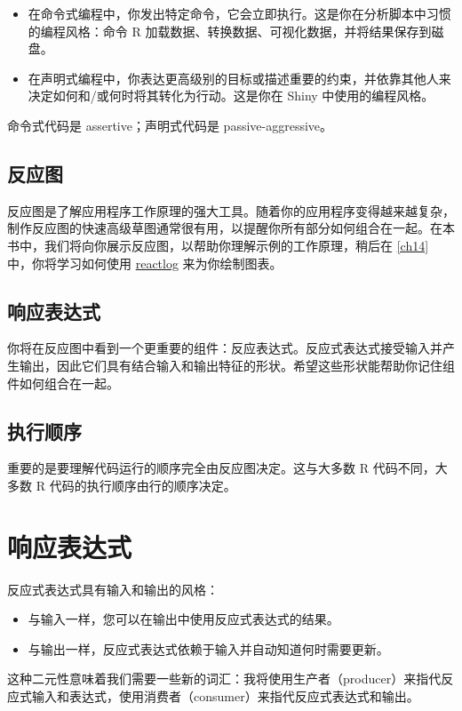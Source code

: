 \begin{itemize}
    \item 在命令式编程中，你发出特定命令，它会立即执行。这是你在分析脚本中习惯的编程风格：命令 R 加载数据、转换数据、可视化数据，并将结果保存到磁盘。
    \item 在声明式编程中，你表达更高级别的目标或描述重要的约束，并依靠其他人来决定如何和/或何时将其转化为行动。这是你在 Shiny 中使用的编程风格。
\end{itemize}
命令式代码是 assertive；声明式代码是 passive-aggressive。
\subsection{反应图}
反应图是了解应用程序工作原理的强大工具。随着你的应用程序变得越来越复杂，制作反应图的快速高级草图通常很有用，以提醒你所有部分如何组合在一起。在本书中，我们将向你展示反应图，以帮助你理解示例的工作原理，稍后在 \autoref{ch14} 中，你将学习如何使用 \href{https://cran.r-project.org/web/packages/reactlog/index.html}{reactlog} 来为你绘制图表。
\subsection{响应表达式}
你将在反应图中看到一个更重要的组件：反应表达式。反应式表达式接受输入并产生输出，因此它们具有结合输入和输出特征的形状。希望这些形状能帮助你记住组件如何组合在一起。
\subsection{执行顺序}
重要的是要理解代码运行的顺序完全由反应图决定。这与大多数 R 代码不同，大多数 R 代码的执行顺序由行的顺序决定。
\section{响应表达式}
反应式表达式具有输入和输出的风格：
\begin{itemize}
    \item 与输入一样，您可以在输出中使用反应式表达式的结果。
    \item 与输出一样，反应式表达式依赖于输入并自动知道何时需要更新。
\end{itemize}
这种二元性意味着我们需要一些新的词汇：我将使用生产者（producer）来指代反应式输入和表达式，使用消费者（consumer）来指代反应式表达式和输出。
